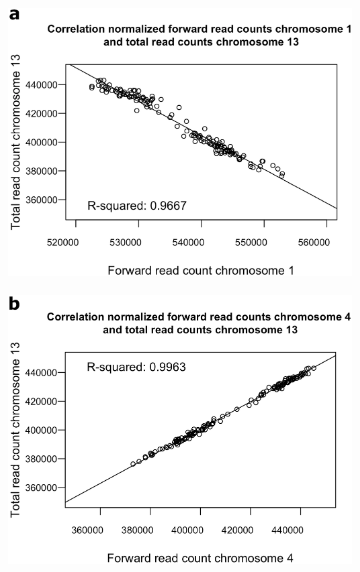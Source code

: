 \begin{figure}[h]
	\begin{subfigure}{.5\textwidth}
		\centering
		\includegraphics[width=1\linewidth]{img/NIPT_Supp3_Fig3_2a}
		\label{fig:NIPT_Supp3_Fig3_2a}
	\end{subfigure}%
	\begin{subfigure}{.5\textwidth}
		\centering
		\includegraphics[width=1\linewidth]{img/NIPT_Supp3_Fig3_2b}
		\label{fig:NIPT_Supp3_Fig3_2b}
	\end{subfigure}
	\begin{subfigure}{.5\textwidth}
		\centering

\end{subfigure}
\end{figure}

